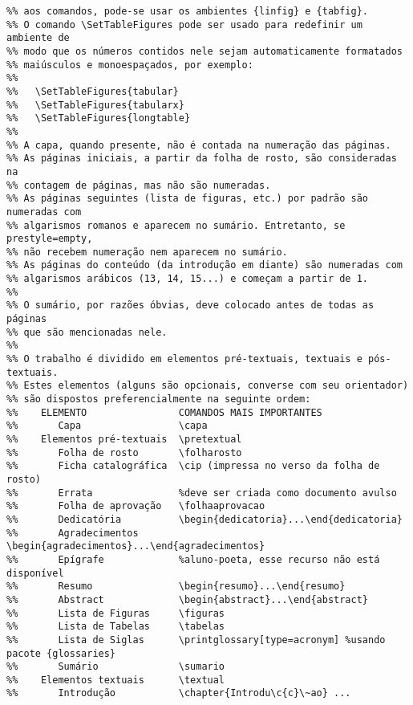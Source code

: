 \begin{verbatim}
%% aos comandos, pode-se usar os ambientes {linfig} e {tabfig}.
%% O comando \SetTableFigures pode ser usado para redefinir um ambiente de
%% modo que os números contidos nele sejam automaticamente formatados
%% maiúsculos e monoespaçados, por exemplo: 
%%
%%   \SetTableFigures{tabular}
%%   \SetTableFigures{tabularx}
%%   \SetTableFigures{longtable}
%%
%% A capa, quando presente, não é contada na numeração das páginas.
%% As páginas iniciais, a partir da folha de rosto, são consideradas na 
%% contagem de páginas, mas não são numeradas.
%% As páginas seguintes (lista de figuras, etc.) por padrão são numeradas com
%% algarismos romanos e aparecem no sumário. Entretanto, se prestyle=empty,
%% não recebem numeração nem aparecem no sumário. 
%% As páginas do conteúdo (da introdução em diante) são numeradas com 
%% algarismos arábicos (13, 14, 15...) e começam a partir de 1.
%%
%% O sumário, por razões óbvias, deve colocado antes de todas as páginas
%% que são mencionadas nele.
%%
%% O trabalho é dividido em elementos pré-textuais, textuais e pós-textuais.
%% Estes elementos (alguns são opcionais, converse com seu orientador)
%% são dispostos preferencialmente na seguinte ordem:
%%    ELEMENTO                COMANDOS MAIS IMPORTANTES
%%       Capa                 \capa
%%    Elementos pré-textuais  \pretextual
%%       Folha de rosto       \folharosto
%%       Ficha catalográfica  \cip (impressa no verso da folha de rosto)
%%       Errata               %deve ser criada como documento avulso
%%       Folha de aprovação   \folhaaprovacao
%%       Dedicatória          \begin{dedicatoria}...\end{dedicatoria}
%%       Agradecimentos       \begin{agradecimentos}...\end{agradecimentos}
%%       Epígrafe             %aluno-poeta, esse recurso não está disponível
%%       Resumo               \begin{resumo}...\end{resumo}
%%       Abstract             \begin{abstract}...\end{abstract}
%%       Lista de Figuras     \figuras
%%       Lista de Tabelas     \tabelas
%%       Lista de Siglas      \printglossary[type=acronym] %usando pacote {glossaries}
%%       Sumário              \sumario
%%    Elementos textuais      \textual
%%       Introdução           \chapter{Introdu\c{c}\~ao} ...

\end{verbatim}
